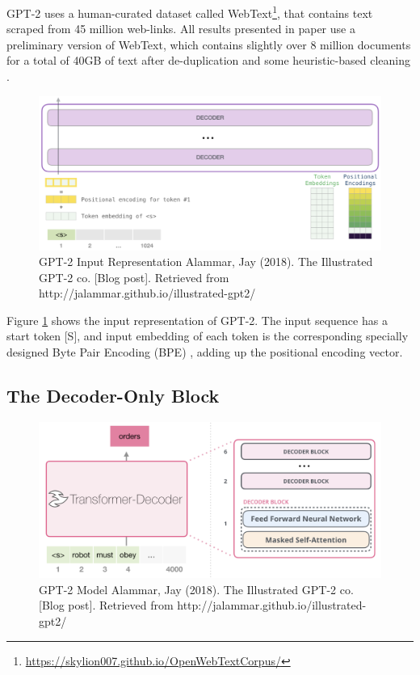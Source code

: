 \documentclass[]{krantz}
\renewcommand{\href}[2]{#2\footnote{\url{#1}}}
\begin{document}
GPT-2 uses a human-curated dataset called \href{https://skylion007.github.io/OpenWebTextCorpus/}{WebText}, that contains text scraped from 45 million web-links. All results presented in paper use a preliminary version of WebText, which contains slightly over 8 million documents for a total of 40GB of text after de-duplication and some heuristic-based cleaning \citet{radford2019gpt2}.

\begin{figure}

{\centering \includegraphics[width=0.7\linewidth]{figures/02-03-transfer-learning-for-nlp/gpt_input_representation} 

}

\caption{GPT-2 Input Representation  
 Alammar, Jay (2018). The Illustrated GPT-2 co. [Blog post]. Retrieved from http://jalammar.github.io/illustrated-gpt2/}\label{fig:ch02-03-figure07}
\end{figure}

Figure \ref{fig:ch02-03-figure07} shows the input representation of GPT-2. The input sequence has a start token {[}S{]}, and input embedding of each token is the corresponding specially designed Byte Pair Encoding (BPE) \citet{sennrich2015neural}, adding up the positional encoding vector.

\hypertarget{the-decoder-only-block}{%
\subsection{The Decoder-Only Block}\label{the-decoder-only-block}}

\begin{figure}

{\centering \includegraphics[width=0.7\linewidth]{figures/02-03-transfer-learning-for-nlp/gpt_decoder} 

}

\caption{GPT-2 Model  
 Alammar, Jay (2018). The Illustrated GPT-2 co. [Blog post]. Retrieved from http://jalammar.github.io/illustrated-gpt2/}\label{fig:ch02-03-figure08}
\end{figure}
\end{document}
